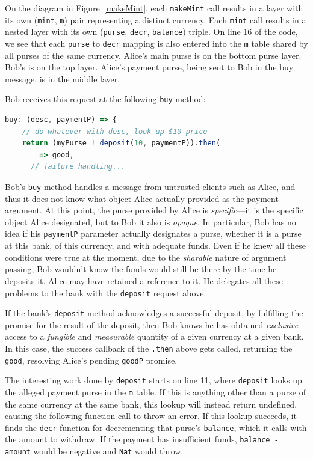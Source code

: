 \documentclass{llncs}
\begin{document}
On the diagram in Figure~\ref{makeMint}, each {\tt makeMint} call results in a layer with its own ({\tt mint}, {\tt m}) pair representing a distinct currency. Each {\tt mint} call results in a nested layer with its own ({\tt purse}, {\tt decr}, {\tt balance}) triple. On line 16 of the code, we see that each {\tt purse} to {\tt decr} mapping is also entered into the {\tt m} table shared by all purses of the same currency. Alice's main purse is on the bottom purse layer. Bob's is on the top layer. Alice's payment purse, being sent to Bob in the buy message, is in the middle layer.

Bob receives this request at the following {\tt buy} method:

\begin{lstlisting}[language=JavaScript,numbers=none]
  buy: (desc, paymentP) => {
    // do whatever with desc, look up $10 price
    return (myPurse ! deposit(10, paymentP)).then(
      _ => good,
      // failure handling...
\end{lstlisting}

Bob's {\tt buy} method handles a message from untrusted clients such as Alice, and thus it does not know what object Alice actually provided as the payment argument. At this point, the purse provided by Alice is \emph{specific}---it is the specific object Alice designated, but to Bob it also is \emph{opaque}. In particular, Bob has no idea if his {\tt paymentP} parameter actually designates a purse, whether it is a purse at this bank, of this currency, and with adequate funds. Even if he knew all these conditions were true at the moment, due to the \emph{sharable} nature of argument passing, Bob wouldn't know the funds would still be there by the time he deposits it. Alice may have retained a reference to it. He delegates all these problems to the bank with the {\tt deposit} request above. 

If the bank's {\tt deposit} method acknowledges a successful deposit, by fulfilling the promise for the result of the deposit, then Bob knows he has obtained \emph{exclusive} access to a \emph{fungible} and \emph{measurable} quantity of a given currency at a given bank. In this case, the success callback of the {\tt .then} above gets called, returning the {\tt good}, resolving Alice's pending {\tt goodP} promise.

The interesting work done by {\tt deposit} starts on line 11, where {\tt deposit} looks up the alleged payment purse in the {\tt m} table. If this is anything other than a purse of the same currency at the same bank, this lookup will instead return undefined, causing the following function call to throw an error. If this lookup succeeds, it finds the {\tt decr} function for decrementing that purse's {\tt balance}, which it calls with the amount to withdraw. If the payment has insufficient funds, {\tt balance - amount} would be negative and {\tt Nat} would throw.
\end{document}
